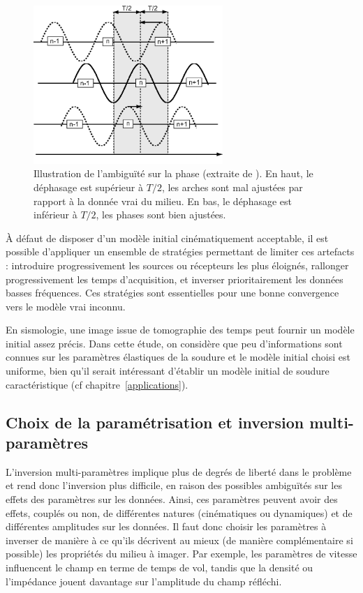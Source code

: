 \begin{figure}[!h]
	\centering
	\includegraphics[height=6cm]{img/ambig_phase.png}
	\caption{Illustration de l'ambiguïté sur la phase (extraite de \cite{brossier_these}). En haut, le déphasage est supérieur à $T/2$, les arches sont mal ajustées par rapport à la donnée vrai du milieu. En bas, le déphasage est inférieur à $T/2$, les phases sont bien ajustées. \label{ambig_phase}}
\end{figure}

À défaut de disposer d'un modèle initial cinématiquement acceptable, il est possible d'appliquer un ensemble de stratégies permettant de limiter ces artefacts : introduire progressivement les sources ou récepteurs les plus éloignés, rallonger progressivement les temps d'acquisition, et inverser prioritairement les données basses fréquences. Ces stratégies sont essentielles pour une bonne convergence vers le modèle vrai inconnu.


En sismologie, une image issue de tomographie des temps peut fournir un modèle initial assez précis. Dans cette étude, on considère que peu d'informations sont connues sur les paramètres élastiques de la soudure et le modèle initial choisi est uniforme, bien qu'il serait intéressant d'établir un modèle initial de soudure caractéristique (cf chapitre~\ref{applications}).


\subsection{Choix de la paramétrisation et inversion multi-paramètres}
L'inversion multi-paramètres implique plus de degrés de liberté dans le problème et rend donc l'inversion plus difficile, en raison des possibles ambiguïtés sur les effets des paramètres sur les données. Ainsi, ces paramètres peuvent avoir des effets, couplés ou non, de différentes natures (cinématiques ou dynamiques) et de différentes amplitudes sur les données. Il faut donc choisir les paramètres à inverser de manière à ce qu'ils décrivent au mieux (de manière complémentaire si possible) les propriétés du milieu à imager. Par exemple, les paramètres de vitesse influencent le champ en terme de temps de vol, tandis que la densité ou l'impédance jouent davantage sur l'amplitude du champ réfléchi.\\


